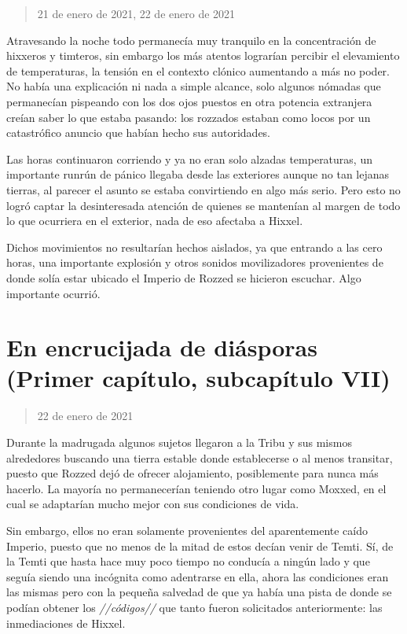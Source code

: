 \documentclass[
  spanish,
]{book}
\begin{document}
\begin{quote}
21 de enero de 2021, 22 de enero de 2021
\end{quote}

Atravesando la noche todo permanecía muy tranquilo en la concentración de hixxeros y timteros, sin embargo los más atentos lograrían percibir el elevamiento de temperaturas, la tensión en el contexto clónico aumentando a más no poder. No había una explicación ni nada a simple alcance, solo algunos nómadas que permanecían pispeando con los dos ojos puestos en otra potencia extranjera creían saber lo que estaba pasando: los rozzados estaban como locos por un catastrófico anuncio que habían hecho sus autoridades.

Las horas continuaron corriendo y ya no eran solo alzadas temperaturas, un importante runrún de pánico llegaba desde las exteriores aunque no tan lejanas tierras, al parecer el asunto se estaba convirtiendo en algo más serio. Pero esto no logró captar la desinteresada atención de quienes se mantenían al margen de todo lo que ocurriera en el exterior, nada de eso afectaba a Hixxel.

Dichos movimientos no resultarían hechos aislados, ya que entrando a las cero horas, una importante explosión y otros sonidos movilizadores provenientes de donde solía estar ubicado el Imperio de Rozzed se hicieron escuchar. Algo importante ocurrió.

\hypertarget{en-encrucijada-de-diuxe1sporas-primer-capuxedtulo-subcapuxedtulo-vii}{%
\section{En encrucijada de diásporas (Primer capítulo, subcapítulo VII)}\label{en-encrucijada-de-diuxe1sporas-primer-capuxedtulo-subcapuxedtulo-vii}}

\begin{quote}
22 de enero de 2021
\end{quote}

Durante la madrugada algunos sujetos llegaron a la Tribu y sus mismos alrededores buscando una tierra estable donde establecerse o al menos transitar, puesto que Rozzed dejó de ofrecer alojamiento, posiblemente para nunca más hacerlo. La mayoría no permanecerían teniendo otro lugar como Moxxed, en el cual se adaptarían mucho mejor con sus condiciones de vida.

Sin embargo, ellos no eran solamente provenientes del aparentemente caído Imperio, puesto que no menos de la mitad de estos decían venir de Temti. Sí, de la Temti que hasta hace muy poco tiempo no conducía a ningún lado y que seguía siendo una incógnita como adentrarse en ella, ahora las condiciones eran las mismas pero con la pequeña salvedad de que ya había una pista de donde se podían obtener los \emph{//códigos//} que tanto fueron solicitados anteriormente: las inmediaciones de Hixxel.
\end{document}
